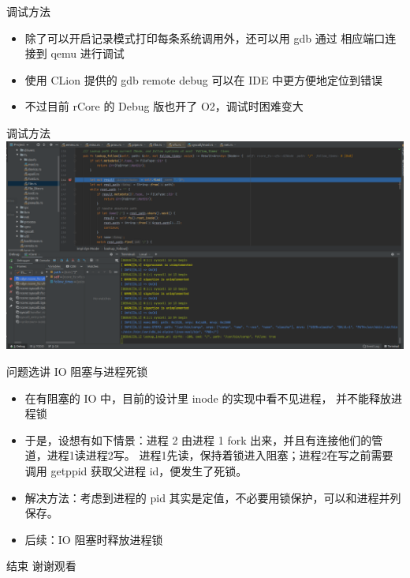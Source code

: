\documentclass{beamer}
\begin{document}
\begin{frame}{调试方法}
    \begin{itemize}
        \setlength{\itemsep}{10pt}
        \item 除了可以开启记录模式打印每条系统调用外，还可以用 gdb 通过
        相应端口连接到 qemu 进行调试
        \item 使用 CLion 提供的 gdb remote debug 可以在 IDE 中更方便地定位到错误
        \item 不过目前 rCore 的 Debug 版也开了 O2，调试时困难变大
    \end{itemize}
\end{frame}

\begin{frame}{调试方法}
    \includegraphics[width=\linewidth]{assets/gdb.png}
    \begin{figure}[]
        \centering
        
    \end{figure}
\end{frame}

\begin{frame}{问题选讲}
    {IO 阻塞与进程死锁}
    \begin{itemize}
        \setlength{\itemsep}{10pt}
        \item 在有阻塞的 IO 中，目前的设计里 inode 的实现中看不见进程，
        并不能释放进程锁
        \item 于是，设想有如下情景：进程 2 由进程 1 fork 出来，并且有连接他们的管道，进程1读进程2写。
        进程1先读，保持着锁进入阻塞；进程2在写之前需要调用 getppid 获取父进程 id，便发生了死锁。
        \item 解决方法：考虑到进程的 pid 其实是定值，不必要用锁保护，可以和进程并列保存。
        \item 后续：IO 阻塞时释放进程锁
    \end{itemize}
\end{frame}

\begin{frame}{结束}
    谢谢观看
\end{frame}
\end{document}
